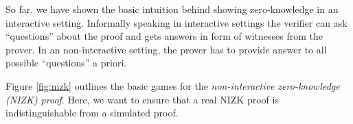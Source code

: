 So far, we have shown the basic intuition behind showing zero-knowledge in an interactive setting.
Informally speaking in interactive settings the verifier can ask ``questions'' about the proof and gets answers in form of witnesses from the prover.
In an non-interactive setting, the prover has to provide answer to all possible ``questions'' a priori.

Figure \ref{fig:nizk} outlines the basic games for the \emph{non-interactive zero-knowledge (NIZK) proof}.
Here, we want to ensure that a real NIZK proof is indistinguishable from a simulated proof.


